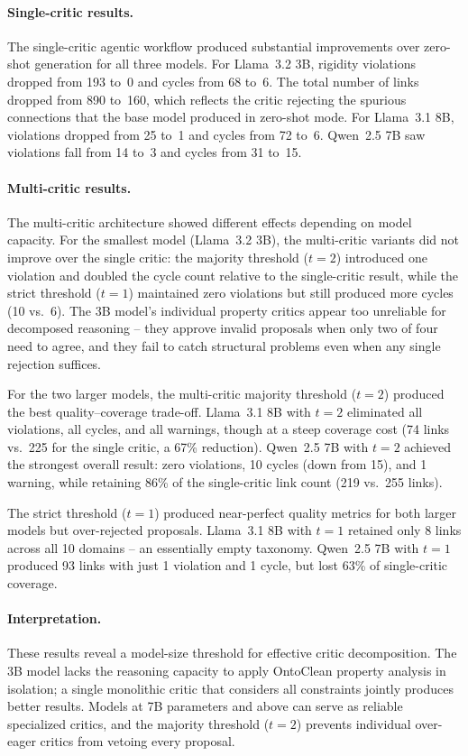 \documentclass{IOS-Book-Article}
\begin{document}
\paragraph{Single-critic results.}
The single-critic agentic workflow produced substantial improvements
over zero-shot generation for all three models.  For Llama~3.2 3B,
rigidity violations dropped from 193 to~0 and cycles from 68 to~6.
The total number of links dropped from 890 to~160, which reflects the
critic rejecting the spurious connections that the base model produced
in zero-shot mode.  For Llama~3.1 8B, violations dropped from 25 to~1
and cycles from 72 to~6.  Qwen~2.5 7B saw violations fall from 14
to~3 and cycles from 31 to~15.

\paragraph{Multi-critic results.}
The multi-critic architecture showed different effects depending on
model capacity.  For the smallest model (Llama~3.2 3B), the
multi-critic variants did not improve over the single critic: the
majority threshold ($t{=}2$) introduced one violation and doubled the
cycle count relative to the single-critic result, while the strict
threshold ($t{=}1$) maintained zero violations but still produced more
cycles (10 vs.\ 6).  The 3B model's individual property critics appear
too unreliable for decomposed reasoning -- they approve invalid
proposals when only two of four need to agree, and they fail to catch
structural problems even when any single rejection suffices.

For the two larger models, the multi-critic majority threshold ($t{=}2$)
produced the best quality--coverage trade-off.  Llama~3.1 8B with
$t{=}2$ eliminated all violations, all cycles, and all warnings, though
at a steep coverage cost (74 links vs.\ 225 for the single critic, a
67\% reduction).  Qwen~2.5 7B with $t{=}2$ achieved the strongest
overall result: zero violations, 10 cycles (down from 15), and 1
warning, while retaining 86\% of the single-critic link count (219
vs.\ 255 links).

The strict threshold ($t{=}1$) produced near-perfect quality metrics
for both larger models but over-rejected proposals.  Llama~3.1 8B with
$t{=}1$ retained only 8 links across all 10 domains -- an essentially
empty taxonomy.  Qwen~2.5 7B with $t{=}1$ produced 93 links with just
1 violation and 1 cycle, but lost 63\% of single-critic coverage.

\paragraph{Interpretation.}
These results reveal a model-size threshold for effective critic
decomposition.  The 3B model lacks the reasoning capacity to apply
OntoClean property analysis in isolation; a single monolithic critic
that considers all constraints jointly produces better results.
Models at 7B parameters and above can serve as reliable specialized
critics, and the majority threshold ($t{=}2$) prevents individual
over-eager critics from vetoing every proposal.
\end{document}

